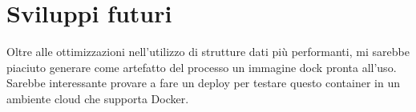 \documentclass[paper=a4, fontsize=11pt]{scrartcl}	%
\numberwithin{equation}{section}															%
\numberwithin{figure}{section}																%
\numberwithin{table}{section}																%
\begin{document}
\section{Sviluppi futuri}
Oltre alle ottimizzazioni nell'utilizzo di strutture dati più performanti, mi sarebbe piaciuto generare come artefatto del processo un immagine dock pronta all'uso. Sarebbe interessante provare a fare un deploy per testare questo container in un ambiente cloud che supporta Docker.
\end{document}
